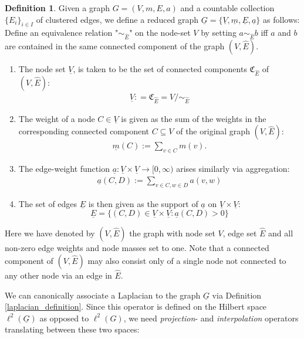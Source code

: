\documentclass[reqno,12pt,letterpaper]{amsart}
\numberwithin{equation}{section}
\newcommand{\1}{\mathds{1}}
\theoremstyle{definition}
\newtheorem{Def}[Th]{Definition}
\begin{document}
\begin{Def}\label{und_coarse_G_def} Given a graph $G = (V, m, E, a)$ and a countable collection $\{E_i\}_{i \in I}$ of clustered edges,
	we define a reduced graph $\underline{G} = \{\underline{V}, \underline{m}, \underline{E},\underline{a}\}$ as follows:
	Define an equivalence relation "$\sim_{\hat{E}}$" on the node-set $V$ by setting $a \sim_{\hat{E}} b $ iff
	 $a$ and $b$ are contained in the same connected component of the graph $(V, \hat{E})$.
	\begin{enumerate}[label=(\roman*), topsep=0pt, itemsep=-.2em]
		\item 	The node set $\underline{V}$, is taken to be the set of connected components $\mathfrak{C}_{\hat{E}}$ of $(V, \hat{E})$:
		\begin{align}
			\underline{V} : =  \mathfrak{C}_{\hat{E}} = V/ \sim_{\hat{E}}
		\end{align}
		\item The weight of a node $C \in \underline{V}$ is given as the sum of the weights in the corresponding connected component $C \subseteq V$ of the original graph $(V, \hat{E})$: 
		\begin{align}\label{mass_def_undirected}
			\underline{m}(C) := \sum\limits_{v \in C} m(v).
		\end{align}
		\item The edge-weight function $\underline{a}:\underline{V} \times \underline{V} \rightarrow [0, \infty)$ arises similarly via aggregation:
		\begin{align}\label{edge_def_undir}
			\underline{a}(C, D) := \sum\limits_{v \in C, w \in D} a(v,w)
		\end{align}
		\item The set of edges $\underline{E}$ is then given as the support of $\underline{a}$ on $\underline{V} \times \underline{V}$:
		\begin{equation}
			\underline{E} = \{(C,D)\in\underline{V}\times\underline{V}: \underline{a}(C,D) >0 \}
		\end{equation}
	\end{enumerate}
\end{Def}
Here we have denoted by $(V,\hat{E})$ the graph with node set $V$, edge set $\hat{E}$ and all non-zero edge weights and node masses set to one. Note that a connected component of $(V,\hat{E})$ may also  consist only of a single node not connected to any other node 
via an edge in $\hat{E}$.


\medskip
 We can  canonically  associate a Laplacian to the graph $\underline{G}$ via Definition \ref{laplacian_definition}. Since this operator is defined on the Hilbert space $\ell^2(\underline{G})$  as opposed to $\ell^2(G)$, we need \emph{projection}- and  \emph{interpolation} operators translating between these two spaces:
 
\end{document}
